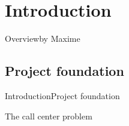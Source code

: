 \section{Introduction}
\begin{frame}{Overview}{by Maxime}
\small
{}	
\end{frame}

\subsection{Project foundation}
\begin{frame}{Introduction}{Project foundation}
	\begin{center}
	The call center problem 
	\end{center}
\end{frame}


